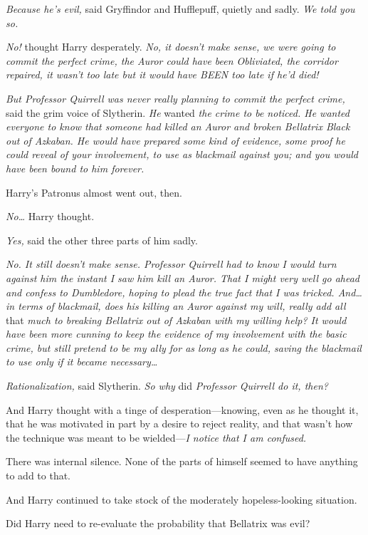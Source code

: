 \emph{Because he's evil,} said Gryffindor and Hufflepuff, quietly and sadly. 
\emph{We told you so.}

\emph{No!} thought Harry desperately. \emph{No, it doesn't make sense, we were 
going to commit the perfect crime, the Auror could have been Obliviated, the 
corridor repaired, it wasn't too late but it would have BEEN too late if he'd 
died!}

\emph{But Professor Quirrell was never really planning to commit the perfect 
crime,} said the grim voice of Slytherin. \emph{He} wanted\emph{ the crime to 
be noticed. He wanted everyone to know that someone had killed an Auror and 
broken Bellatrix Black out of Azkaban. He would have prepared some kind of 
evidence, some proof he could reveal of your involvement, to use as blackmail 
against you; and you would have been bound to him forever.}

Harry's Patronus almost went out, then.

\emph{No{\ldots}} Harry thought.

\emph{Yes,} said the other three parts of him sadly.

\emph{No. It still doesn't make sense. Professor Quirrell had to know I would 
turn against him the instant I saw him kill an Auror. That I might very well go 
ahead and confess to Dumbledore, hoping to plead the true fact that I was 
tricked. And{\ldots} in terms of blackmail, does his killing an Auror against 
my will, really add all} that\emph{ much to breaking Bellatrix out of Azkaban 
with my willing help? It would have been more cunning to keep the evidence of 
my involvement with the basic crime, but still pretend to be my ally for as 
long as he could, saving the blackmail to use only if it became 
necessary{\ldots}}

\emph{Rationalization,} said Slytherin. \emph{So why} did\emph{ Professor 
Quirrell do it, then?}

And Harry thought with a tinge of desperation---knowing, even as he thought it, 
that he was motivated in part by a desire to reject reality, and that wasn't 
how the technique was meant to be wielded---\emph{I notice that I am confused.}

There was internal silence. None of the parts of himself seemed to have 
anything to add to that.

And Harry continued to take stock of the moderately hopeless-looking situation.

Did Harry need to re-evaluate the probability that Bellatrix was evil?


